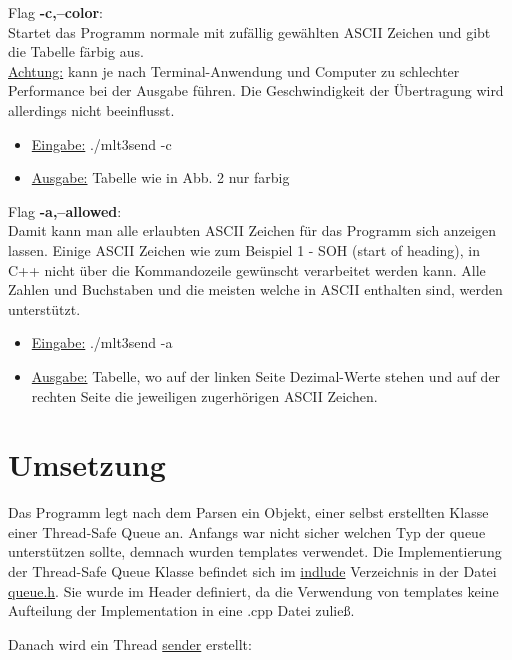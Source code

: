 \documentclass{article}
\begin{document}
Flag \textbf{-c,--color}:\\
Startet das Programm normale mit zufällig gewählten ASCII Zeichen und gibt die Tabelle färbig aus.\\
\underline{Achtung:} kann je nach Terminal-Anwendung und Computer zu schlechter Performance bei der Ausgabe führen. Die Geschwindigkeit der Übertragung wird
allerdings nicht beeinflusst.

\begin{itemize}
	\item \underline{Eingabe:} ./mlt3send -c
	\item \underline{Ausgabe:} Tabelle wie in Abb. 2 nur farbig\\
\end{itemize}

Flag \textbf{-a,--allowed}:\\
Damit kann man alle erlaubten ASCII Zeichen für das Programm sich anzeigen lassen. Einige ASCII Zeichen wie zum Beispiel 1 - SOH (start of heading), in C++ nicht über die
Kommandozeile gewünscht verarbeitet werden kann. Alle Zahlen und Buchstaben und die meisten welche in ASCII enthalten sind, werden unterstützt.

\begin{itemize}
	\item \underline{Eingabe:} ./mlt3send -a
	\item \underline{Ausgabe:} Tabelle, wo auf der linken Seite Dezimal-Werte stehen und auf der rechten Seite die jeweiligen zugerhörigen ASCII Zeichen.\\
\end{itemize}

\section{Umsetzung}
Das Programm legt nach dem Parsen ein Objekt, einer selbst erstellten Klasse einer Thread-Safe Queue an. Anfangs war nicht sicher welchen Typ der queue unterstützen sollte,
demnach wurden templates verwendet. Die Implementierung der Thread-Safe Queue Klasse befindet sich im \underline{indlude} Verzeichnis in der Datei \underline{queue.h}. Sie
wurde im Header definiert, da die Verwendung von templates keine Aufteilung der Implementation in eine .cpp Datei zuließ.

Danach wird ein Thread \underline{sender} erstellt:

\underline{}
\end{document}
